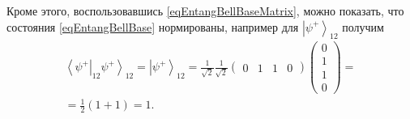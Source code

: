 Кроме этого, воспользовавшись \eqref{eqEntangBellBaseMatrix}, можно
показать, что состояния \eqref{eqEntangBellBase} нормированы, например
для $\left|\psi^{+}\right>_{12}$ получим 
\begin{eqnarray}
\left<\psi^{+}\right|_{12}\left.\psi^{+}\right>_{12} = 
  \left|\psi^{+}\right>_{12} = 
  \frac{1}{\sqrt{2}} \frac{1}{\sqrt{2}}
  \left(
  \begin{array}{cccc}
    0 & 1 & 1 & 0
  \end{array}
  \right)   
  \left(
  \begin{array}{c}
    0 \\
    1 \\
    1 \\
    0
  \end{array}
  \right) = 
\nonumber \\
=
  \frac{1}{2}\left(1 + 1\right) = 1.
\nonumber 
\end{eqnarray}
